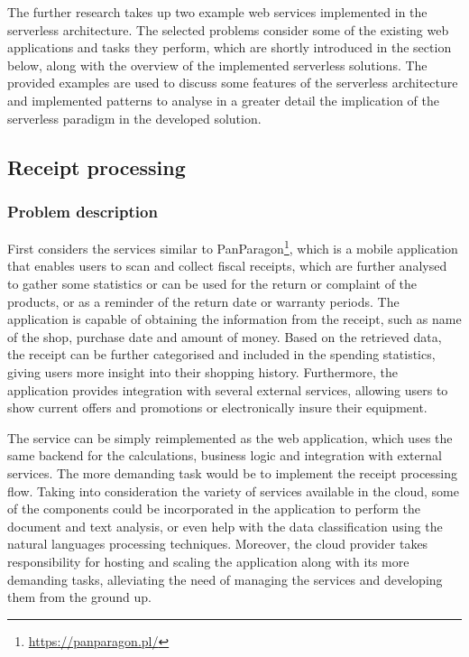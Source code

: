 The further research takes up two example web services implemented in the serverless architecture. 
The selected problems consider some of the existing web applications and tasks they perform, which are shortly introduced in the section below, along with the overview of the implemented serverless solutions.
The provided examples are used to discuss some features of the serverless architecture and implemented patterns to analyse in a greater detail the implication of the serverless paradigm in the developed solution.

\subsection{Receipt processing} \label{chapter:examples-receipt-processing}

\subsubsection{Problem description}

First considers the services similar to PanParagon\footnote{\url{https://panparagon.pl/}}, which is a mobile application that enables users to scan and collect fiscal receipts, which are further analysed to gather some statistics or can be used for the return or complaint of the products, or as a reminder of the return date or warranty periods.
The application is capable of obtaining the information from the receipt, such as name of the shop, purchase date and amount of money. Based on the retrieved data, the receipt can be further categorised and included in the spending statistics, giving users more insight into their shopping history. Furthermore, the application provides integration with several external services, allowing users to show current offers and promotions or electronically insure their equipment.

The service can be simply reimplemented as the web application, which uses the same backend for the calculations, business logic and integration with external services. The more demanding task would be to implement the receipt processing flow. Taking into consideration the variety of services available in the cloud, some of the components could be incorporated in the application to perform the document and text analysis, or even help with the data classification using the natural languages processing techniques. Moreover, the cloud provider takes responsibility for hosting and scaling the application along with its more demanding tasks, alleviating the need of managing the services and developing them from the ground up.

